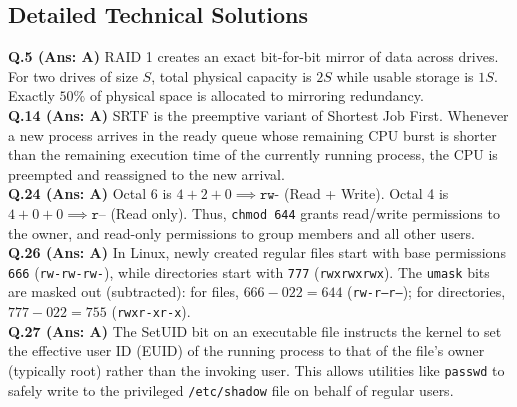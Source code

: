 \vspace{3mm}
\subsection*{Detailed Technical Solutions}

\begin{solutionbox}
\textbf{Q.5 (Ans: A)} RAID 1 creates an exact bit-for-bit mirror of data across drives. For two drives of size $S$, total physical capacity is $2S$ while usable storage is $1S$. Exactly $50\%$ of physical space is allocated to mirroring redundancy.\\[2mm]
\textbf{Q.14 (Ans: A)} SRTF is the preemptive variant of Shortest Job First. Whenever a new process arrives in the ready queue whose remaining CPU burst is shorter than the remaining execution time of the currently running process, the CPU is preempted and reassigned to the new arrival.\\[2mm]
\textbf{Q.24 (Ans: A)} Octal 6 is $4+2+0 \implies \texttt{rw-}$ (Read + Write). Octal 4 is $4+0+0 \implies \texttt{r--}$ (Read only). Thus, \texttt{chmod 644} grants read/write permissions to the owner, and read-only permissions to group members and all other users.\\[2mm]
\textbf{Q.26 (Ans: A)} In Linux, newly created regular files start with base permissions \texttt{666} (\texttt{rw-rw-rw-}), while directories start with \texttt{777} (\texttt{rwxrwxrwx}). The \texttt{umask} bits are masked out (subtracted): for files, $666 - 022 = 644$ (\texttt{rw-r--r--}); for directories, $777 - 022 = 755$ (\texttt{rwxr-xr-x}).\\[2mm]
\textbf{Q.27 (Ans: A)} The SetUID bit on an executable file instructs the kernel to set the effective user ID (EUID) of the running process to that of the file's owner (typically root) rather than the invoking user. This allows utilities like \texttt{passwd} to safely write to the privileged \texttt{/etc/shadow} file on behalf of regular users.
\end{solutionbox}

\newpage
